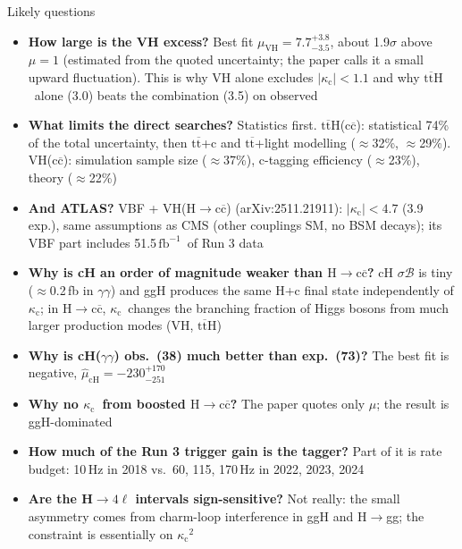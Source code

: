 \documentclass[aspectratio=169,10pt,xcolor=table]{beamer}
\newcommand{\qbar}[1]{\mathrm{#1}\overline{\mathrm{#1}}}
\newcommand{\ccbar}{\ensuremath{\qbar{c}}}
\newcommand{\kc}{\ensuremath{\kappa_\mathrm{c}}}
\newcommand{\Hcc}{\ensuremath{\mathrm{H}\to\qbar{c}}}
\newcommand{\ttH}{\ensuremath{\qbar{t}\mathrm{H}}}
\newcommand{\ttbar}{\ensuremath{\qbar{t}}}
\newcommand{\fbinv}{\ensuremath{\,\mathrm{fb}^{-1}}}
\newcommand{\up}{\vspace*{-0.8em}}
\begin{document}
\begin{frame}[t]{Likely questions}
  \up
  \footnotesize
  \begin{itemize}\setlength\itemsep{1pt}
    \item \textbf{How large is the VH excess?} Best fit $\mu_\mathrm{VH} = 7.7^{+3.8}_{-3.5}$, about 1.9$\sigma$ above $\mu=1$ (estimated from the quoted uncertainty; the paper calls it a small upward fluctuation). This is why VH alone excludes $|\kc|<1.1$ and why \ttH\ alone (3.0) beats the combination (3.5) on observed
    \item \textbf{What limits the direct searches?} Statistics first. \ttH(\ccbar): statistical 74\% of the total uncertainty, then \ttbar+c and \ttbar+light modelling ($\approx$32\%, $\approx$29\%). VH(\ccbar): simulation sample size ($\approx$37\%), c-tagging efficiency ($\approx$23\%), theory ($\approx$22\%)
    \item \textbf{And ATLAS?} VBF + VH(\Hcc) (arXiv:2511.21911): $|\kc| < 4.7$ (3.9 exp.), same assumptions as CMS (other couplings SM, no BSM decays); its VBF part includes 51.5\fbinv\ of Run 3 data
    \item \textbf{Why is cH an order of magnitude weaker than \Hcc?} cH $\sigma\mathcal{B}$ is tiny ($\approx$0.2\,fb in $\gamma\gamma$) and ggH produces the same H+c final state independently of \kc; in \Hcc, \kc\ changes the branching fraction of Higgs bosons from much larger production modes (VH, \ttH)
    \item \textbf{Why is cH($\gamma\gamma$) obs.\ (38) much better than exp.\ (73)?} The best fit is negative, $\hat\mu_\mathrm{cH} = -230^{+170}_{-251}$
    \item \textbf{Why no \kc\ from boosted \Hcc?} The paper quotes only $\mu$; the result is ggH-dominated
    \item \textbf{How much of the Run 3 trigger gain is the tagger?} Part of it is rate budget: 10\,Hz in 2018 vs.\ 60, 115, 170\,Hz in 2022, 2023, 2024
    \item \textbf{Are the H$\to4\ell$ intervals sign-sensitive?} Not really: the small asymmetry comes from charm-loop interference in ggH and H$\to$gg; the constraint is essentially on $\kc^2$
  \end{itemize}
\end{frame}
\end{document}
